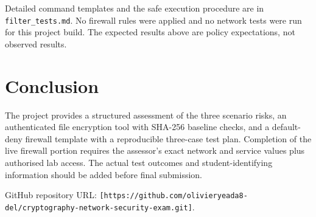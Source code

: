 \documentclass[11pt,a4paper]{article}
\begin{document}
Detailed command templates and the safe execution procedure are in \texttt{filter\_tests.md}. No firewall rules were applied and no network tests were run for this project build. The expected results above are policy expectations, not observed results.

\section{Conclusion}
The project provides a structured assessment of the three scenario risks, an authenticated file encryption tool with SHA-256 baseline checks, and a default-deny firewall template with a reproducible three-case test plan. Completion of the live firewall portion requires the assessor's exact network and service values plus authorised lab access. The actual test outcomes and student-identifying information should be added before final submission.

GitHub repository URL: \texttt{[https://github.com/olivieryeada8-del/cryptography-network-security-exam.git]}.
\end{document}
